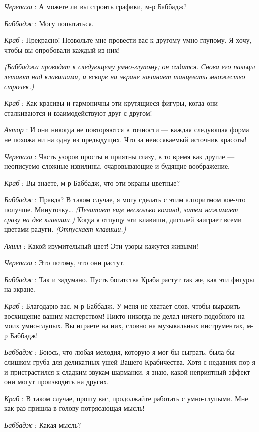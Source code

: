 \documentclass[../main.tex]{subfiles}
\begin{document}
\begin{dialogue}
\emph{Черепаха} : А можете ли вы строить графики, м-р Баббадж?

\emph{Баббадж} : Могу попытаться.

\emph{Краб} : Прекрасно! Позвольте мне провести вас к другому умно-глупому. Я хочу, чтобы вы опробовали каждый из них!

\emph{(Баббаджа проводят к следующему умно-глупому; он садится. Снова его пальцы летают над клавишами, и вскоре на экране начинает танцевать множество строчек.)}

\emph{Краб} : Как красивы и гармоничны эти крутящиеся фигуры, когда они сталкиваются и взаимодействуют друг с другом!

\emph{Автор} : И они никогда не повторяются в точности --- каждая следующая форма не похожа ни на одну из предыдущих. Что за неиссякаемый источник красоты!

\emph{Черепаха} : Часть узоров просты и приятны глазу, в то время как другие --- неописуемо сложные извилины, очаровывающие и будящие воображение.

\emph{Краб} : Вы знаете, м-р Баббадж, что эти экраны цветные?

\emph{Баббадж} : Правда? В таком случае, я могу сделать с этим алгоритмом кое-что получше. Минуточку\ldots{} \emph{(Печатает еще несколько команд, затем нажимает сразу на две клавиши.)} Когда я отпущу эти клавиши, дисплей заиграет всеми цветами радуги. \emph{(Отпускает клавиши.)}

\emph{Ахилл} : Какой изумительный цвет! Эти узоры кажутся живыми!

\emph{Черепаха} : Это потому, что они растут.

\emph{Баббадж} : Так и задумано. Пусть богатства Краба растут так же, как эти фигуры на экране.

\emph{Краб} : Благодарю вас, м-р Баббадж. У меня не хватает слов, чтобы выразить восхищение вашим мастерством! Никто никогда не делал ничего подобного на моих умно-глупых. Вы играете на них, словно на музыкальных инструментах, м-р Баббадж!

\emph{Баббадж} : Боюсь, что любая мелодия, которую я мог бы сыграть, была бы слишком груба для деликатных ушей Вашего Крабичества. Хотя с недавних пор я и пристрастился к сладким звукам шарманки, я знаю, какой неприятный эффект они могут производить на других.

\emph{Краб} : В таком случае, прошу вас, продолжайте работать с умно-глупыми. Мне как раз пришла в голову потрясающая мысль!

\emph{Баббадж} : Какая мысль?


\end{dialogue}
\end{document}
